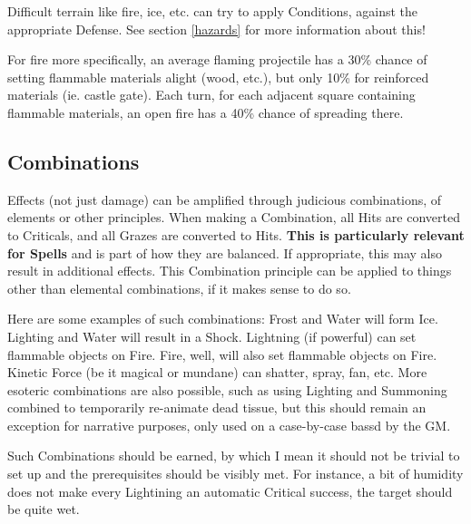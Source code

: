Difficult terrain like fire, ice, etc. can try to apply Conditions, against the appropriate Defense. See section \ref{hazards} for more information about this!

For fire more specifically, an average flaming projectile has a 30\% chance of setting flammable materials alight (wood, etc.), but only 10\% for reinforced materials (ie. castle gate). Each turn, for each adjacent square containing flammable materials, an open fire has a 40\% chance of spreading there.



\subsection{Combinations}

\label{combinations}

Effects (not just damage) can be amplified through judicious combinations, of elements or other principles. When making a Combination, all Hits are converted to Criticals, and all Grazes are converted to Hits. \textbf{This is particularly relevant for Spells} and is part of how they are balanced. If appropriate, this may also result in additional effects. This Combination principle can be applied to things other than elemental combinations, if it makes sense to do so.

Here are some examples of such combinations: Frost and Water will form Ice. Lighting and Water will result in a Shock. Lightning (if powerful) can set flammable objects on Fire. Fire, well, will also set flammable objects on Fire. Kinetic Force (be it magical or mundane) can shatter, spray, fan, etc. More esoteric combinations are also possible, such as using Lighting and Summoning combined to temporarily re-animate dead tissue, but this should remain an exception for narrative purposes, only used on a case-by-case bassd by the GM.

Such Combinations should be earned, by which I mean it should not be trivial to set up and the prerequisites should be visibly met. For instance, a bit of humidity does not make every Lightining an automatic Critical success, the target should be quite wet.

